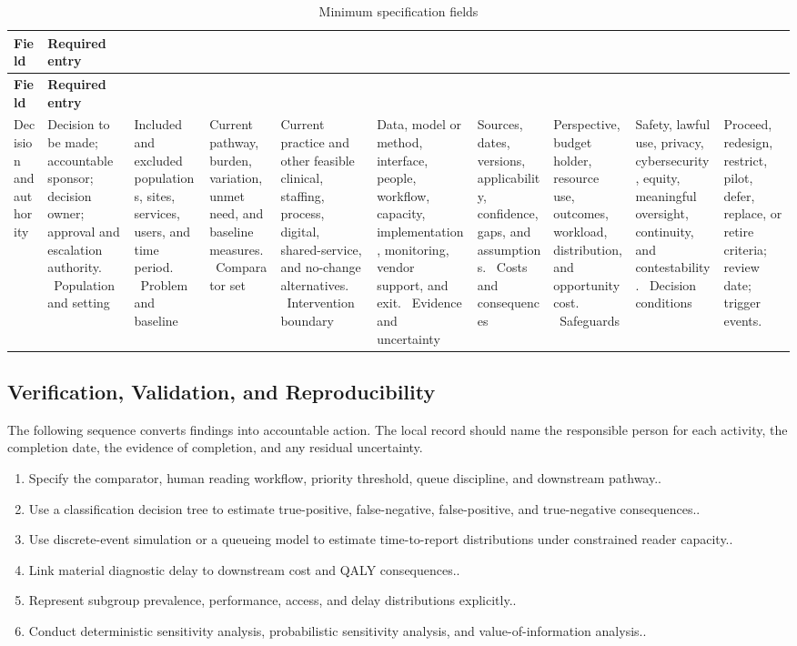 \begin{longtable}{@{}p{}p{}@{}}
\caption{Minimum specification fields}
\label{tab:comp-ch08-spec-fields}\\
\toprule
\textbf{Field} & \textbf{Required entry} \\
\midrule
\endfirsthead
\toprule
\textbf{Field} & \textbf{Required entry} \\
\midrule
\endhead
\bottomrule
\endlastfoot
Decision and authority & Decision to be made; accountable sponsor; decision owner; approval and escalation authority. \
Population and setting & Included and excluded populations, sites, services, users, and time period. \
Problem and baseline & Current pathway, burden, variation, unmet need, and baseline measures. \
Comparator set & Current practice and other feasible clinical, staffing, process, digital, shared-service, and no-change alternatives. \
Intervention boundary & Data, model or method, interface, people, workflow, capacity, implementation, monitoring, vendor support, and exit. \
Evidence and uncertainty & Sources, dates, versions, applicability, confidence, gaps, and assumptions. \
Costs and consequences & Perspective, budget holder, resource use, outcomes, workload, distribution, and opportunity cost. \
Safeguards & Safety, lawful use, privacy, cybersecurity, equity, meaningful oversight, continuity, and contestability. \
Decision conditions & Proceed, redesign, restrict, pilot, defer, replace, or retire criteria; review date; trigger events. \
\end{longtable}

\subsection{Verification, Validation, and Reproducibility}
\label{sec:comp-ch08-supp-2}
The following sequence converts findings into accountable action. The local record
should name the responsible person for each activity, the completion date, the
evidence of completion, and any residual uncertainty.

\begin{enumerate}
 \item Specify the comparator, human reading workflow, priority threshold, queue discipline, and downstream pathway..
 \item Use a classification decision tree to estimate true-positive, false-negative, false-positive, and true-negative consequences..
 \item Use discrete-event simulation or a queueing model to estimate time-to-report distributions under constrained reader capacity..
 \item Link material diagnostic delay to downstream cost and QALY consequences..
 \item Represent subgroup prevalence, performance, access, and delay distributions explicitly..
 \item Conduct deterministic sensitivity analysis, probabilistic sensitivity analysis, and value-of-information analysis..
\end{enumerate}

